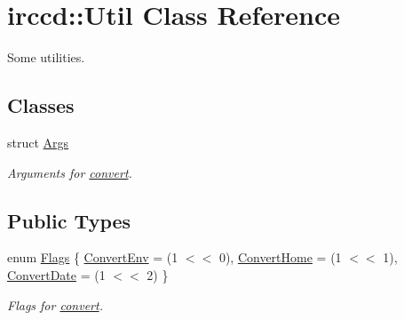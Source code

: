 \hypertarget{a00069}{\section{irccd\-:\-:Util Class Reference}
\label{a00069}
}


Some utilities.  


\subsection*{Classes}
\begin{DoxyCompactItemize}
\item 
struct \hyperlink{a00002}{Args}
\begin{DoxyCompactList}\small\item\em Arguments for \hyperlink{a00069_a9214eb255c16d84fd26752530e2b5e94}{convert}. \end{DoxyCompactList}\end{DoxyCompactItemize}
\subsection*{Public Types}
\begin{DoxyCompactItemize}
\item 
enum \hyperlink{a00069_a54c1cec58d78f37d2feb6c16aee294af}{Flags} \{ \hyperlink{a00069_a54c1cec58d78f37d2feb6c16aee294afa2ecfc7747124b2781d88a2d4b307d89d}{Convert\-Env} = (1 $<$$<$ 0), 
\hyperlink{a00069_a54c1cec58d78f37d2feb6c16aee294afae8fcce2b65f6231c657ccf77ab972bc2}{Convert\-Home} = (1 $<$$<$ 1), 
\hyperlink{a00069_a54c1cec58d78f37d2feb6c16aee294afa977282d3d9ae2887cc5063142a1f10b0}{Convert\-Date} = (1 $<$$<$ 2)
 \}
\begin{DoxyCompactList}\small\item\em Flags for \hyperlink{a00069_a9214eb255c16d84fd26752530e2b5e94}{convert}. \end{DoxyCompactList}\end{DoxyCompactItemize}
